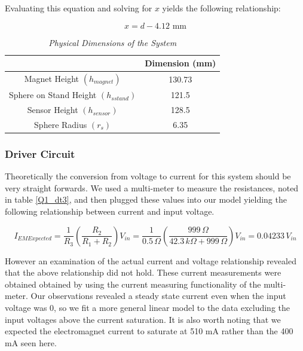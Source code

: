 \documentclass{article}
\theoremstyle{plain}
\theoremstyle{definition}
\theoremstyle{remark}
\begin{document}
Evaluating this equation and solving for $x$ yields the following relationship:

$$ x = d - 4.12 \text{ mm} $$

\begin{table}
\begin{center}
    \begin{tabular}{|c|c|}
        \hline
        ~                                    & Dimension (mm) \\ \hline
        Magnet Height $(h_{magnet}) $          & 130.73         \\ 
        Sphere on Stand Height $(h_{s stand})$ & 121.5          \\ 
        Sensor Height $(h_{sensor})$           & 128.5          \\ 
        Sphere Radius $(r_{s})$                & 6.35           \\
        \hline
    \end{tabular}
\caption{\emph{Physical Dimensions of the System}}
\label{Q1_dt2}
\end{center}
\end{table}

\subsubsection*{Driver Circuit}

Theoretically the conversion from voltage to current for this system should be very straight forwards.  We used a multi-meter to measure the resistances, noted in table \ref{Q1_dt3}, and then plugged these values into our model yielding the following relationship between current and input voltage.

$$ I_{EM Expected}=\frac{1}{R_3}\left(\frac{R_2}{R_1+R_2}\right)V_{in} = \frac{1}{0.5 \,\Omega}\left(\frac{999 \,\Omega}{42.3 \,k\Omega + 999 \,\Omega}\right)V_{in} = 0.04233 \, V_{in}$$

However an examination of the actual current and voltage relationship revealed that the above relationship did not hold.  These current measurements were obtained obtained by using the current measuring functionality of the multi-meter.  Our observations revealed a steady state current even when the input voltage was 0, so we fit a more general linear model to the data excluding the input voltages above the current saturation.  It is also worth noting that we expected the electromagnet current to saturate at 510 mA rather than the 400 mA seen here.
\end{document}
